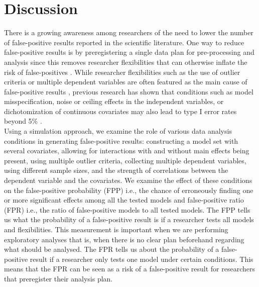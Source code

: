 \section{Discussion}
There is a growing awareness among researchers of the need to lower the number of false-positive results reported in the scientific literature. One way to reduce false-positive results is by preregistering a single data plan for pre-processing and analysis since this removes researcher flexibilities that can otherwise inflate the risk of false-positives \citep{simmons2018}. While researcher flexibilities such as the use of outlier criteria or multiple dependent variables are often featured as the main cause of false-positive results \citep{John2012}, previous research has shown that conditions such as model misspecification, noise or ceiling effects in the independent variables, or dichotomization of continuous covariates may also lead to type I error rates beyond 5\% \citep{Dennis2019, Litiere2007, Brunner2009, Austin2003, Austin2004}. \\

Using a simulation approach, we examine the role of various data analysis conditions in generating false-positive results: constructing a model set with several covariates, allowing for interactions with and without main effects being present, using multiple outlier criteria, collecting multiple dependent variables, using different sample sizes, and the strength of correlations between the dependent variable and the covariates. We examine the effect of these conditions on the false-positive probability (FPP) i.e., the chance of erroneously finding one or more significant effects among all the tested models and false-positive ratio (FPR) i.e., the ratio of  false-positive models to all tested models. The FPP tells us what the probability of a false-positive result is if a researcher tests all models and flexibilities. This measurement is important when we are performing exploratory analyses that is, when there is no clear plan beforehand regarding what should be analysed. The FPR tells us about the probability of a false-positive result if a researcher only tests one model under certain conditions. This means that the FPR can be seen as a risk of a false-positive result for researchers that preregister their analysis plan.


